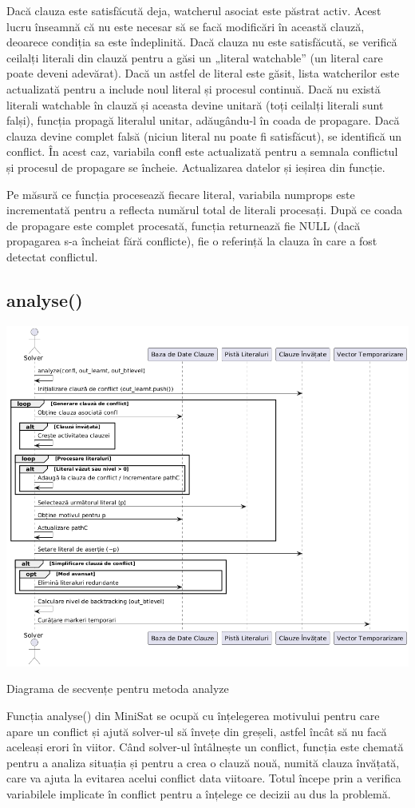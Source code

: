 \documentclass[runningheads]{llncs}
\begin{document}
Dacă clauza este satisfăcută deja, watcherul asociat este păstrat activ. Acest lucru înseamnă că nu este necesar să se facă modificări în această clauză, deoarece condiția sa este îndeplinită.
Dacă clauza nu este satisfăcută, se verifică ceilalți literali din clauză pentru a găsi un „literal watchable” (un literal care poate deveni adevărat). Dacă un astfel de literal este găsit, lista watcherilor este actualizată pentru a include noul literal și procesul continuă.
Dacă nu există literali watchable în clauză și aceasta devine unitară (toți ceilalți literali sunt falși), funcția propagă literalul unitar, adăugându-l în coada de propagare.
Dacă clauza devine complet falsă (niciun literal nu poate fi satisfăcut), se identifică un conflict. În acest caz, variabila confl este actualizată pentru a semnala conflictul și procesul de propagare se încheie. Actualizarea datelor și ieșirea din funcție.

Pe măsură ce funcția procesează fiecare literal, variabila num\underline{}props este incrementată pentru a reflecta numărul total de literali procesați. După ce coada de propagare este complet procesată, funcția returnează fie NULL (dacă propagarea s-a încheiat fără conflicte), fie o referință la clauza în care a fost detectat conflictul.
\newpage
\subsection{analyse()}
\begin{center}
    \includegraphics[width=1.0\textwidth]{images/diagrams/pseudo_code/analyze_romana_2.png}
     \caption{Diagrama de secvențe pentru metoda analyze}
\end{center}
Funcția analyse() din MiniSat se ocupă cu înțelegerea motivului pentru care apare un conflict și ajută solver-ul să învețe din greșeli, astfel încât să nu facă aceleași erori în viitor. Când solver-ul întâlnește un conflict, funcția este chemată pentru a analiza situația și pentru a crea o clauză nouă, numită clauza învățată, care va ajuta la evitarea acelui conflict data viitoare. Totul începe prin a verifica variabilele implicate în conflict pentru a înțelege ce decizii au dus la problemă.
\end{document}
